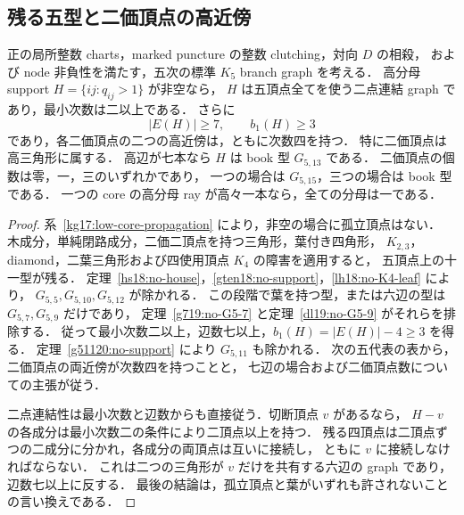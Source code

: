 \subsection{残る五型と二価頂点の高近傍}
\label{sf20:section}

\begin{corollary}[非空支持の連結性と二価頂点の制約]
\label{sf20:no-leaves}
正の局所整数 charts，marked puncture の整数 clutching，対向 $D$ の相殺，
および node 非負性を満たす，五次の標準 $K_5$ branch graph を考える．
高分母 support $H=\{ij:q_{ij}>1\}$ が非空なら，
$H$ は五頂点全てを使う二点連結 graph であり，最小次数は二以上である．
さらに
\[
 |E(H)|\ge7,\qquad b_1(H)\ge3
\]
であり，各二価頂点の二つの高近傍は，ともに次数四を持つ．
特に二価頂点は高三角形に属する．
高辺が七本なら $H$ は book 型 $G_{5,13}$ である．
二価頂点の個数は零，一，三のいずれかであり，
一つの場合は $G_{5,15}$，三つの場合は book 型である．
一つの core の高分母 ray が高々一本なら，全ての分母は一である．
\end{corollary}

\begin{proof}
系~\ref{kg17:low-core-propagation} により，非空の場合に孤立頂点はない．
木成分，単純閉路成分，二価二頂点を持つ三角形，葉付き四角形，
$K_{2,3}$，diamond，二葉三角形および四使用頂点 $K_4$ の障害を適用すると，
五頂点上の十一型が残る．
定理~\ref{hs18:no-house}，\ref{gten18:no-support}，\ref{lh18:no-K4-leaf} により，
$G_{5,5},G_{5,10},G_{5,12}$ が除かれる．
この段階で葉を持つ型，または六辺の型は $G_{5,7},G_{5,9}$ だけであり，
定理~\ref{g719:no-G5-7} と定理~\ref{dl19:no-G5-9} がそれらを排除する．
従って最小次数二以上，辺数七以上，$b_1(H)=|E(H)|-4\ge3$ を得る．
定理~\ref{g51120:no-support} により $G_{5,11}$ も除かれる．
次の五代表の表から，二価頂点の両近傍が次数四を持つことと，
七辺の場合および二価頂点数についての主張が従う．

二点連結性は最小次数と辺数からも直接従う．切断頂点 $v$ があるなら，
$H-v$ の各成分は最小次数二の条件により二頂点以上を持つ．
残る四頂点は二頂点ずつの二成分に分かれ，各成分の両頂点は互いに接続し，
ともに $v$ に接続しなければならない．
これは二つの三角形が $v$ だけを共有する六辺の graph であり，辺数七以上に反する．
最後の結論は，孤立頂点と葉がいずれも許されないことの言い換えである．
\end{proof}

